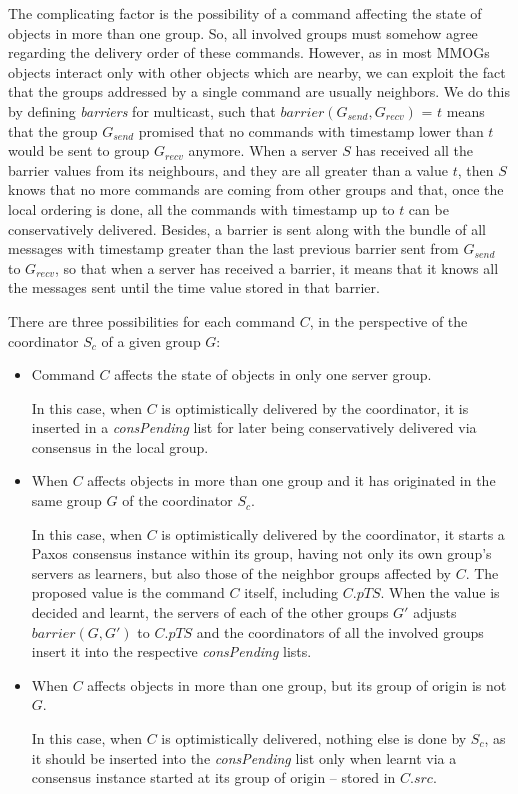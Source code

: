 \documentclass[times, 10pt]{article}
\begin{document}
The complicating factor is the possibility of a command affecting the state of objects in more than one group. So, all involved groups must somehow agree regarding the delivery order of these commands. However, as in most MMOGs objects interact only with other objects which are nearby, we can exploit the fact that the groups addressed by a single command are usually neighbors. We do this by defining \emph{barriers} for multicast, such that $barrier(G_{send},G_{recv})$ = $t$ means that the group $G_{send}$ promised that no commands with timestamp lower than $t$ would be sent to group $G_{recv}$ anymore. When a server $S$ has received all the barrier values from its neighbours, and they are all greater than a value $t$, then $S$ knows that no more commands are coming from other groups and that, once the local ordering is done, all the commands with timestamp up to $t$ can be conservatively delivered. Besides, a barrier is sent along with the bundle of all messages with timestamp greater than the last previous barrier sent from $G_{send}$ to $G_{recv}$, so that when a server has received a barrier, it means that it knows all the messages sent until the time value stored in that barrier. 

There are three possibilities for each command $C$, in the perspective of the coordinator $S_c$ of a given group $G$:

\begin{itemize}
  \item Command $C$ affects the state of objects in only one server group.
  
  In this case, when $C$ is optimistically delivered by the coordinator, it is inserted in a \textit{consPending} list for later being conservatively delivered via consensus in the local group.

  \item When $C$ affects objects in more than one group and it has originated in the same group $G$ of the coordinator $S_c$.
  
  In this case, when $C$ is optimistically delivered by the coordinator, it starts a Paxos consensus instance within its group, having not only its own group's servers as learners, but also those of the neighbor groups affected by $C$. The proposed value is the command $C$ itself, including $C.pTS$. When the value is decided and learnt, the servers of each of the other groups $G'$ adjusts $barrier(G, G')$ to $C.pTS$ and the coordinators of all the involved groups insert it into the respective \textit{consPending} lists. 
  
  \item When $C$ affects objects in more than one group, but its group of origin is not $G$.
  
  In this case, when $C$ is optimistically delivered, nothing else is done by $S_c$, as it should be inserted into the \textit{consPending} list only when learnt via a consensus instance started at its group of origin -- stored in $C.src$.
\end{itemize}
\end{document}
